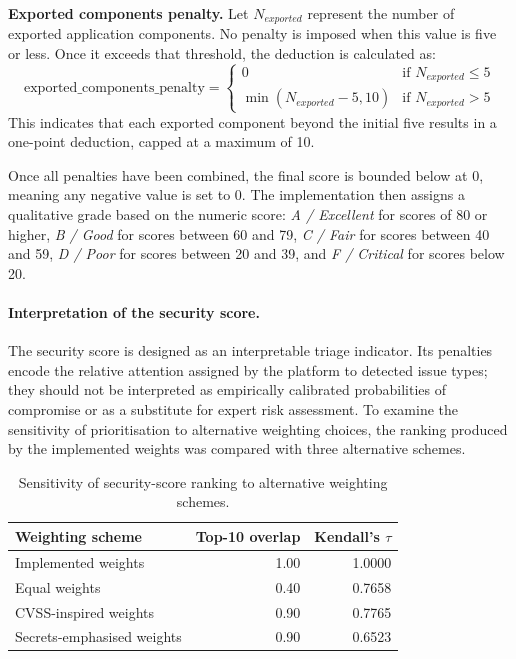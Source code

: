 \documentclass[preprint,12pt, a4paper]{elsarticle}
\begin{document}
\textbf{Exported components penalty.} Let $N_{exported}$ represent the number of exported application components. No penalty is imposed when this value is five or less. Once it exceeds that threshold, the deduction is calculated as:
    \[
    \mathrm{exported\_components\_penalty} =
    \begin{cases}
    0 & \text{if } N_{exported} \leq 5 \\
    \min\left(N_{exported}-5, 10\right) & \text{if } N_{exported} > 5
    \end{cases}
    \]
    This indicates that each exported component beyond the initial five results in a one-point deduction, capped at a maximum of 10.

Once all penalties have been combined, the final score is bounded below at 0, meaning any negative value is set to 0. The implementation then assigns a qualitative grade based on the numeric score: \textit{A / Excellent} for scores of 80 or higher, \textit{B / Good} for scores between 60 and 79, \textit{C / Fair} for scores between 40 and 59, \textit{D / Poor} for scores between 20 and 39, and \textit{F / Critical} for scores below 20.

{\color{blue}\paragraph{Interpretation of the security score.}
The security score is designed as an interpretable triage indicator. Its penalties encode the relative attention assigned by the platform to detected issue types; they should not be interpreted as empirically calibrated probabilities of compromise or as a substitute for expert risk assessment. To examine the sensitivity of prioritisation to alternative weighting choices, the ranking produced by the implemented weights was compared with three alternative schemes.}

{\color{blue}
\begin{table}[H]
\centering
\caption{Sensitivity of security-score ranking to alternative weighting schemes.}
\label{tab:score-sensitivity}
\begin{tabular}{lrr}
\toprule
\textbf{Weighting scheme} & \textbf{Top-10 overlap} & \textbf{Kendall's $\tau$} \\
\midrule
Implemented weights & 1.00 & 1.0000 \\
Equal weights & 0.40 & 0.7658 \\
CVSS-inspired weights & 0.90 & 0.7765 \\
Secrets-emphasised weights & 0.90 & 0.6523 \\
\bottomrule
\end{tabular}
\end{table}
}
\end{document}
